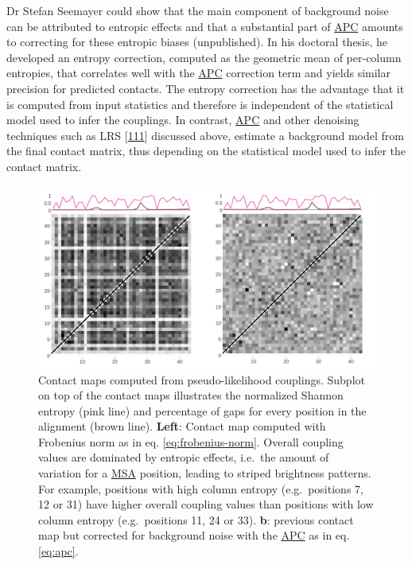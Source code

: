 \documentclass[11pt,a4paper,twoside]{book}
\theoremstyle{definition}
\theoremstyle{definition}
\theoremstyle{remark}
\begin{document}
Dr Stefan Seemayer could show that the main component of background
noise can be attributed to entropic effects and that a substantial part
of \protect\hyperlink{abbrev}{APC} amounts to correcting for these
entropic biases (unpublished). In his doctoral thesis, he developed an
entropy correction, computed as the geometric mean of per-column
entropies, that correlates well with the \protect\hyperlink{abbrev}{APC}
correction term and yields similar precision for predicted contacts. The
entropy correction has the advantage that it is computed from input
statistics and therefore is independent of the statistical model used to
infer the couplings. In contrast, \protect\hyperlink{abbrev}{APC} and
other denoising techniques such as LRS
{[}\protect\hyperlink{ref-Zhang2016}{111}{]} discussed above, estimate a
background model from the final contact matrix, thus depending on the
statistical model used to infer the contact matrix.















\begin{figure}

{\centering \includegraphics[width=0.9\linewidth]{img/intro/apc_correction_with_entropy} 

}

\caption{Contact maps computed from
pseudo-likelihood couplings. Subplot on top of the contact maps
illustrates the normalized Shannon entropy ({pink } line) and percentage
of gaps for every position in the alignment ({brown } line).
\textbf{Left}: Contact map computed with Frobenius norm as in eq.
\eqref{eq:frobenius-norm}. Overall coupling values are dominated by
entropic effects, i.e.~the amount of variation for a
\protect\hyperlink{abbrev}{MSA} position, leading to striped brightness
patterns. For example, positions with high column entropy
(e.g.~positions 7, 12 or 31) have higher overall coupling values than
positions with low column entropy (e.g.~positions 11, 24 or 33).
\textbf{b}: previous contact map but corrected for background noise with
the \protect\hyperlink{abbrev}{APC} as in eq. \eqref{eq:apc}.}\label{fig:apc-correction}
\end{figure}
\end{document}
